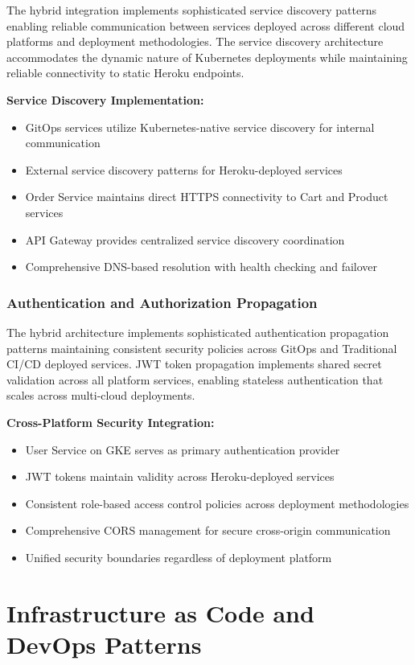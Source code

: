 The hybrid integration implements sophisticated service discovery patterns enabling reliable communication between services deployed across different cloud platforms and deployment methodologies. The service discovery architecture accommodates the dynamic nature of Kubernetes deployments while maintaining reliable connectivity to static Heroku endpoints.

\textbf{Service Discovery Implementation:}
\begin{itemize}
\item GitOps services utilize Kubernetes-native service discovery for internal communication
\item External service discovery patterns for Heroku-deployed services
\item Order Service maintains direct HTTPS connectivity to Cart and Product services
\item API Gateway provides centralized service discovery coordination
\item Comprehensive DNS-based resolution with health checking and failover
\end{itemize}

\subsubsection{Authentication and Authorization Propagation}

The hybrid architecture implements sophisticated authentication propagation patterns maintaining consistent security policies across GitOps and Traditional CI/CD deployed services. JWT token propagation implements shared secret validation across all platform services, enabling stateless authentication that scales across multi-cloud deployments.

\textbf{Cross-Platform Security Integration:}
\begin{itemize}
\item User Service on GKE serves as primary authentication provider
\item JWT tokens maintain validity across Heroku-deployed services
\item Consistent role-based access control policies across deployment methodologies
\item Comprehensive CORS management for secure cross-origin communication
\item Unified security boundaries regardless of deployment platform
\end{itemize}

\section{Infrastructure as Code and DevOps Patterns}

